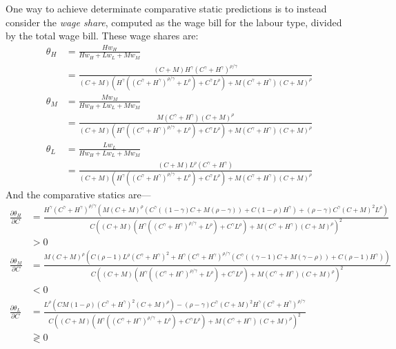 \documentclass[a4paper]{article}
\begin{document}
One way to achieve determinate comparative static predictions is to instead consider the {\em wage share}, computed as the wage bill for the labour type, divided by the total wage bill. These wage shares are:
\begin{align*}
\theta_H &= \frac{H w_H}{H w_H+L w_L+M w_M} \\
&= \frac{(C+M) H^{\gamma } \left(C^{\gamma }+H^{\gamma }\right)^{\rho /\gamma }}{(C+M) \left(H^{\gamma } \left(\left(C^{\gamma }+H^{\gamma }\right)^{\rho /\gamma }+L^{\rho }\right)+C^{\gamma } L^{\rho }\right)+M \left(C^{\gamma }+H^{\gamma }\right) (C+M)^{\rho }} \\
\theta_M &= \frac{M w_M}{H w_H+L w_L+M w_M} \\
&= \frac{M \left(C^{\gamma }+H^{\gamma }\right) (C+M)^{\rho }}{(C+M) \left(H^{\gamma } \left(\left(C^{\gamma }+H^{\gamma }\right)^{\rho /\gamma }+L^{\rho }\right)+C^{\gamma } L^{\rho }\right)+M \left(C^{\gamma }+H^{\gamma }\right) (C+M)^{\rho }}\\
\theta_L &= \frac{L w_L}{H w_H+L w_L+M w_M} \\
&= \frac{(C+M) L^{\rho } \left(C^{\gamma }+H^{\gamma }\right)}{(C+M) \left(H^{\gamma } \left(\left(C^{\gamma }+H^{\gamma }\right)^{\rho /\gamma }+L^{\rho }\right)+C^{\gamma } L^{\rho }\right)+M \left(C^{\gamma }+H^{\gamma }\right) (C+M)^{\rho }}
\end{align*}
And the comparative statics are---
\begin{align*}
\frac{\partial \theta_H}{\partial C}
&= \frac{H^{\gamma } \left(C^{\gamma }+H^{\gamma }\right)^{\rho /\gamma } \left(M (C+M)^{\rho } \left(C^{\gamma } ((1-\gamma)C+M (\rho -\gamma )) + C (1 - \rho) H^{\gamma }\right)+(\rho - \gamma) C^{\gamma } (C+M)^2 L^{\rho }\right)}{C \left((C+M) \left(H^{\gamma } \left(\left(C^{\gamma }+H^{\gamma }\right)^{\rho /\gamma }+L^{\rho }\right)+C^{\gamma } L^{\rho }\right)+M \left(C^{\gamma }+H^{\gamma }\right) (C+M)^{\rho }\right)^2} \\
&>0 \\
%
\frac{\partial \theta_M}{\partial C}
&= \frac{M (C+M)^{\rho } \left(C (\rho -1) L^{\rho } \left(C^{\gamma }+H^{\gamma }\right)^2+H^{\gamma } \left(C^{\gamma }+H^{\gamma }\right)^{\rho /\gamma } \left(C^{\gamma } ((\gamma -1) C+M (\gamma -\rho ))+C (\rho -1) H^{\gamma }\right)\right)}{C \left((C+M) \left(H^{\gamma } \left(\left(C^{\gamma }+H^{\gamma }\right)^{\rho /\gamma }+L^{\rho }\right)+C^{\gamma } L^{\rho }\right)+M \left(C^{\gamma }+H^{\gamma }\right) (C+M)^{\rho }\right)^2} \\
& < 0 \\
%
\frac{\partial \theta_L}{\partial C}
&= \frac{L^{\rho } \left(C M (1 - \rho) \left(C^{\gamma }+H^{\gamma }\right)^2 (C+M)^{\rho }\right)- (\rho - \gamma) C^{\gamma } (C+M)^2 H^{\gamma } \left(C^{\gamma }+H^{\gamma }\right)^{\rho /\gamma }}{C \left((C+M) \left(H^{\gamma } \left(\left(C^{\gamma }+H^{\gamma }\right)^{\rho /\gamma }+L^{\rho }\right)+C^{\gamma } L^{\rho }\right)+M \left(C^{\gamma }+H^{\gamma }\right) (C+M)^{\rho }\right)^2}\\
& \gtrless 0
\end{align*}
\end{document}
